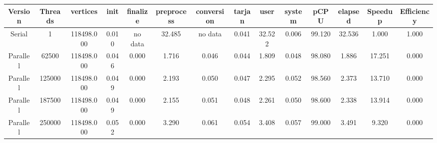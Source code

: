 \begin{tabular}{|c|c|c|c|c|c|c|c|c|c|c|c|c|c|}
\toprule
 Version &  Threads &   vertices &  init & finalize &  preprocess & conversion &  tarjan &   user &  system &   pCPU &  elapsed &  Speedup &  Efficiency \\
\midrule
  Serial &        1 & 118498.000 & 0.010 &  no data &      32.485 &    no data &   0.041 & 32.522 &   0.006 & 99.120 &   32.536 &    1.000 &       1.000 \\
Parallel &    62500 & 118498.000 & 0.046 &    0.000 &       1.716 &      0.046 &   0.044 &  1.809 &   0.048 & 98.080 &    1.886 &   17.251 &       0.000 \\
Parallel &   125000 & 118498.000 & 0.049 &    0.000 &       2.193 &      0.050 &   0.047 &  2.295 &   0.052 & 98.560 &    2.373 &   13.710 &       0.000 \\
Parallel &   187500 & 118498.000 & 0.049 &    0.000 &       2.155 &      0.051 &   0.048 &  2.261 &   0.050 & 98.600 &    2.338 &   13.914 &       0.000 \\
Parallel &   250000 & 118498.000 & 0.052 &    0.000 &       3.290 &      0.061 &   0.054 &  3.408 &   0.057 & 99.000 &    3.491 &    9.320 &       0.000 \\
\bottomrule
\end{tabular}

